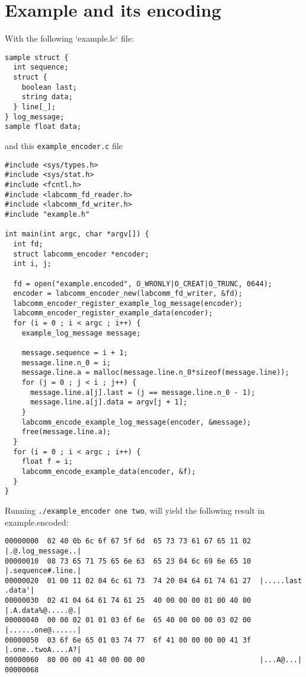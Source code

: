 \documentclass[a4paper]{article}
\begin{document}
\section{Example and its encoding}

With the following `example.lc` file:

\begin{verbatim}
sample struct {
  int sequence;
  struct {
    boolean last;
    string data;
  } line[_];
} log_message;
sample float data;
\end{verbatim}

and this \verb+example_encoder.c+ file 

\begin{verbatim}
#include <sys/types.h>
#include <sys/stat.h>
#include <fcntl.h>
#include <labcomm_fd_reader.h>
#include <labcomm_fd_writer.h>
#include "example.h"

int main(int argc, char *argv[]) {
  int fd;
  struct labcomm_encoder *encoder;
  int i, j;

  fd = open("example.encoded", O_WRONLY|O_CREAT|O_TRUNC, 0644);
  encoder = labcomm_encoder_new(labcomm_fd_writer, &fd);
  labcomm_encoder_register_example_log_message(encoder);
  labcomm_encoder_register_example_data(encoder);
  for (i = 0 ; i < argc ; i++) {
    example_log_message message;

    message.sequence = i + 1;
    message.line.n_0 = i;
    message.line.a = malloc(message.line.n_0*sizeof(message.line));
    for (j = 0 ; j < i ; j++) {
      message.line.a[j].last = (j == message.line.n_0 - 1);
      message.line.a[j].data = argv[j + 1];
    }
    labcomm_encode_example_log_message(encoder, &message);
    free(message.line.a);
  }
  for (i = 0 ; i < argc ; i++) {
    float f = i;
    labcomm_encode_example_data(encoder, &f);
  }
}
\end{verbatim}

Running \verb+./example_encoder one two+, will yield the following result in example.encoded:


\begin{verbatim}
00000000  02 40 0b 6c 6f 67 5f 6d  65 73 73 61 67 65 11 02  |.@.log_message..|
00000010  08 73 65 71 75 65 6e 63  65 23 04 6c 69 6e 65 10  |.sequence#.line.|
00000020  01 00 11 02 04 6c 61 73  74 20 04 64 61 74 61 27  |.....last .data'|
00000030  02 41 04 64 61 74 61 25  40 00 00 00 01 00 40 00  |.A.data%@.....@.|
00000040  00 00 02 01 01 03 6f 6e  65 40 00 00 00 03 02 00  |......one@......|
00000050  03 6f 6e 65 01 03 74 77  6f 41 00 00 00 00 41 3f  |.one..twoA....A?|
00000060  80 00 00 41 40 00 00 00                           |...A@...|
00000068
\end{verbatim}
\end{document}
